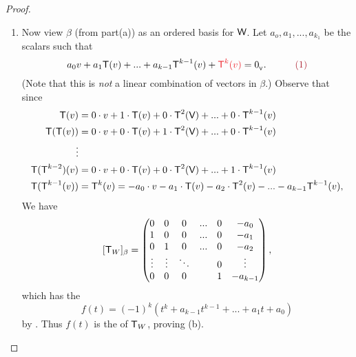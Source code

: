 \begin{proof}
\begin{enumerate}
\item Now view \(\beta\) (from part(a)) as an ordered basis for \(\textsf{W}\).
Let \(a_o, a_1, ..., a_{k_1}\) be the scalars such that
\[
    a_0 v + a_1 \T(v) + ... + a_{k - 1} \T^{k - 1} (v) + \RED{\T^k(v)} = \OV. \quad \quad \quad \MAROON{(1)}
\]
(Note that this is \emph{not} a linear combination of vectors in \(\beta\).)
Observe that since
\begin{align*}
    \textsf{T}(v) & = 0 \cdot v + 1 \cdot \textsf{T}(v) + 0 \cdot \textsf{T}^2(\textsf{V}) + ... + 0 \cdot \textsf{T}^{k - 1}(v) \\
    \textsf{T}(\textsf{T}(v)) & = 0 \cdot v + 0 \cdot \textsf{T}(v) + 1 \cdot \textsf{T}^2(\textsf{V}) + ... + 0 \cdot \textsf{T}^{k - 1}(v) \\
    \vdots \\
    \textsf{T}(\textsf{T}^{k - 2})(v) & = 0 \cdot v + 0 \cdot \textsf{T}(v) + 0 \cdot \textsf{T}^2(\textsf{V}) + ... + 1 \cdot \textsf{T}^{k - 1}(v) \\
    \textsf{T}(\textsf{T}^{k - 1}(v)) & = \textsf{T}^k(v) = -a_0 \cdot v -a_1 \cdot \textsf{T}(v) - a_2 \cdot \textsf{T}^2(v) - ... - a_{k - 1} \textsf{T}^{k - 1}(v),
\end{align*}
We have
\[
    [\textsf{T}_W]_{\beta} = \begin{pmatrix}
        0 & 0 & 0 & ... & 0 & -a_0 \\
        1 & 0 & 0 & ... & 0 & -a_1 \\
        0 & 1 & 0 & ... & 0 & -a_2 \\
        \vdots & \vdots & \ddots & & 0 & \vdots \\
        0 & 0 & 0 & & 1 & -a_{k - 1}
    \end{pmatrix},
\]
which has the \CPOLY{}
\[
    f(t) = (-1)^k (t^k + a_{k - 1} t^{k-1} + ... + a_1 t + a_0)
\]
by .
Thus \(f(t)\) is the \CPOLY{} of \(\textsf{T}_W\), proving (b).
\end{enumerate}
\end{proof}

